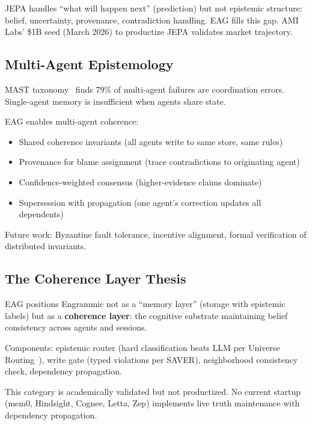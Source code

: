 \documentclass[11pt,letterpaper]{article}
\begin{document}
JEPA handles ``what will happen next'' (prediction) but not epistemic structure: belief, uncertainty, provenance, contradiction handling. EAG fills this gap. AMI Labs' \$1B seed (March 2026) to productize JEPA validates market trajectory.

\subsection{Multi-Agent Epistemology}

MAST taxonomy~\cite{mast2025} finds 79\% of multi-agent failures are coordination errors. Single-agent memory is insufficient when agents share state.

EAG enables multi-agent coherence:
\begin{itemize}[noitemsep]
    \item Shared coherence invariants (all agents write to same store, same rules)
    \item Provenance for blame assignment (trace contradictions to originating agent)
    \item Confidence-weighted consensus (higher-evidence claims dominate)
    \item Supersession with propagation (one agent's correction updates all dependents)
\end{itemize}

Future work: Byzantine fault tolerance, incentive alignment, formal verification of distributed invariants.

\subsection{The Coherence Layer Thesis}

EAG positions Engrammic not as a ``memory layer'' (storage with epistemic labels) but as a \textbf{coherence layer}: the cognitive substrate maintaining belief consistency across agents and sessions.

Components: epistemic router (hard classification beats LLM per Universe Routing~\cite{universe2026}), write gate (typed violations per SAVER), neighborhood consistency check, dependency propagation.

This category is academically validated but not productized. No current startup (mem0, Hindsight, Cognee, Letta, Zep) implements live truth maintenance with dependency propagation.

\end{document}
